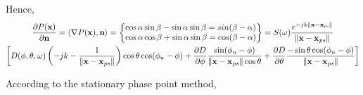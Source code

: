 Hence,
\begin{multline}
\frac{\partial P(\PosTheo)}{\partial \mathbf{n}} = \langle \nabla P(\PosTheo), \vec{n} \rangle = \left\{
\begin{matrix}
	\cos\alpha \sin\beta - \sin\alpha \sin\beta = sin(\beta - \alpha) \\ \cos\alpha \cos\beta + \sin\alpha\sin\beta = \cos(\beta - \alpha)
\end{matrix}  \right\}
= S(\omega) \GreenFunc[{\PosTheo - \PosTheo[primarySource]}] \\ \left[ D(\azimuth, \elevation, \omega) \left(-jk - \frac{1}{\norm{\PosTheo - \PosTheo[primarySource]}}\right) \cos\elevation \cos(\azimuthNormal - \azimuth) + \frac{\partial D}{\partial \azimuth} \frac{\sin (\azimuthNormal - \azimuth)}{\norm{\PosTheo - \PosTheo[primarySource]} \cos \elevation} + \frac{\partial D}{\partial \elevation} \frac{-\sin\elevation \cos(\azimuthNormal - \azimuth)}{\norm{\PosTheo - \PosTheo[primarySource]}}  \right] 
\end{multline}

According to the stationary phase point method,





